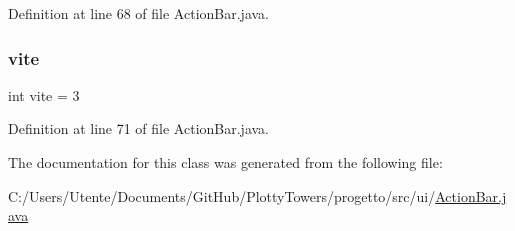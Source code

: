 Definition at line 68 of file Action\+Bar.\+java.

\mbox{\label{classui_1_1_action_bar_ace261aa2e09513de9acfbe08311c0f07}} 
\subsubsection{\texorpdfstring{vite}{vite}}
{\footnotesize\ttfamily int vite = 3\hspace{0.3cm}{\ttfamily [private]}}



Definition at line 71 of file Action\+Bar.\+java.



The documentation for this class was generated from the following file\+:\begin{DoxyCompactItemize}
\item 
C\+:/\+Users/\+Utente/\+Documents/\+Git\+Hub/\+Plotty\+Towers/progetto/src/ui/\hyperlink{_action_bar_8java}{Action\+Bar.\+java}\end{DoxyCompactItemize}
